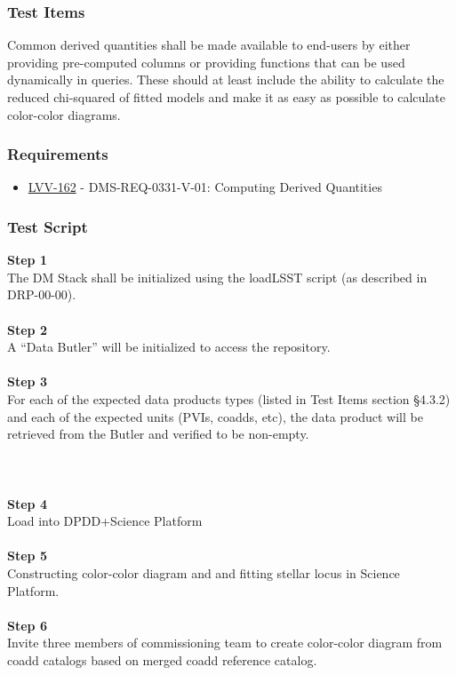 \hypertarget{test-items-114}{%
\subsubsection{Test Items}\label{test-items-114}}

Common derived quantities shall be made available to end-users by either
providing pre-computed columns or providing functions that can be used
dynamically in queries. These should at least include the ability to
calculate the reduced chi-squared of fitted models and make it as easy
as possible to calculate color-color diagrams.

\hypertarget{requirements-114}{%
\subsubsection{Requirements}\label{requirements-114}}

\begin{itemize}
\tightlist
\item
  \href{https://jira.lsstcorp.org/browse/LVV-162}{LVV-162} -
  DMS-REQ-0331-V-01: Computing Derived Quantities
\end{itemize}

\hypertarget{test-script-114}{%
\subsubsection{Test Script}\label{test-script-114}}

\textbf{Step 1}\\
The DM Stack shall be initialized using the loadLSST script (as
described in DRP-00-00).\\
~\\
\textbf{Step 2}\\
A ``Data Butler'' will be initialized to access the repository.\\
~\\
\textbf{Step 3}\\
For each of the expected data products types (listed in Test Items
section §4.3.2) and each of the expected units (PVIs, coadds, etc), the
data product will be retrieved from the Butler and verified to be
non-empty.\\
~\\
~\\
~\\
\textbf{Step 4}\\
Load into DPDD+Science Platform\\
~\\
\textbf{Step 5}\\
Constructing color-color diagram and and fitting stellar locus in
Science Platform.\\
~\\
\textbf{Step 6}\\
Invite three members of commissioning team to create color-color diagram
from coadd catalogs based on merged coadd reference catalog.\\
~\\

